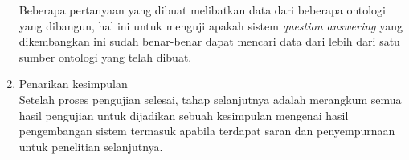 \begin{enumerate}
	Beberapa pertanyaan yang dibuat melibatkan data dari beberapa ontologi yang dibangun, hal ini untuk menguji apakah sistem \emph{question answering} yang dikembangkan ini sudah benar-benar dapat mencari data dari lebih dari satu sumber ontologi yang telah dibuat.
	\item Penarikan kesimpulan\\
	Setelah proses pengujian selesai, tahap selanjutnya adalah merangkum semua hasil pengujian untuk dijadikan sebuah kesimpulan mengenai hasil pengembangan sistem termasuk apabila terdapat saran dan penyempurnaan untuk penelitian selanjutnya.
\end{enumerate}